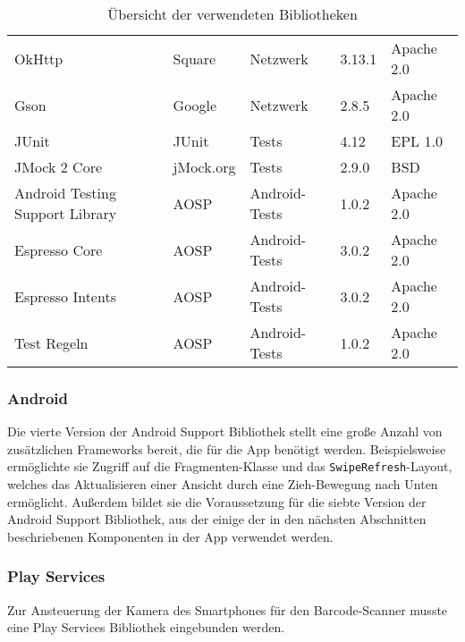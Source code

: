 \begin{table}[h]
\begin{tabularx}{\textwidth}{|X|l|l|l|l|}
		OkHttp & Square & Netzwerk & 3.13.1 & Apache 2.0\\   %
		Gson & Google & Netzwerk & 2.8.5 & Apache 2.0\\   %
		\hline

		JUnit & JUnit & Tests & 4.12 & EPL 1.0\\   %
		JMock 2 Core & jMock.org & Tests & 2.9.0 & BSD\\    %
		\hline

		Android Testing Support Library & AOSP & Android-Tests & 1.0.2 & Apache 2.0\\   %
		Espresso Core & AOSP & Android-Tests & 3.0.2 & Apache 2.0\\    %
		Espresso Intents & AOSP & Android-Tests & 3.0.2 & Apache 2.0\\ %
		Test Regeln & AOSP & Android-Tests & 1.0.2 & Apache 2.0\\  %
		\hline
	\end{tabularx}

	\caption{Übersicht der verwendeten Bibliotheken}
	\label{tab:libraries}
\end{table}

\subsubsection{Android} \label{subsubsec:android-libraries}
Die vierte Version der Android Support Bibliothek stellt eine große Anzahl von zusätzlichen Frameworks bereit, die für die App benötigt werden.
Beispielsweise ermöglichte sie Zugriff auf die Fragmenten-Klasse und das \texttt{SwipeRefresh}-Layout, welches das Aktualisieren einer Ansicht durch eine Zieh-Bewegung nach Unten ermöglicht.
Außerdem bildet sie die Voraussetzung für die siebte Version der Android Support Bibliothek, aus der einige der in den nächsten Abschnitten beschriebenen Komponenten in der App verwendet werden.

\subsubsection{Play Services} \label{subsubsec:play-service-libraries}
Zur Ansteuerung der Kamera des Smartphones für den Barcode-Scanner musste eine Play Services Bibliothek eingebunden werden.

